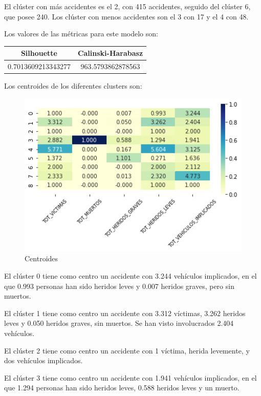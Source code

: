 \documentclass[a4]{article}
\begin{document}
El clúster con más accidentes es el 2, con 415 accidentes, seguido del clúster 6, que posee 240. Los clúster con menos accidentes son el 3 con 17 y el 4 con 48.

Los valores de las métricas para este modelo son:

\begin{center}
\begin{tabular}{|c|c|}
\hline
\multicolumn{1}{|c|}{\textbf{Silhouette}} & \textbf{Calinski-Harabasz}\\ \hline
  0.7013609213343277 & 963.5793862878563 \\ \hline
\end{tabular}
\end{center}

Los centroides de los diferentes clusters son:

\begin{figure}[H]
  \centering
  \caption{Centroides}
  \includegraphics[width=130mm]{imagenes/c2_kmeans_centroides}
\end{figure}

El clúster 0 tiene como centro un accidente con 3.244 vehículos implicados, en el que 0.993 personas han sido heridos leves y 0.007 heridos graves, pero sin muertos.

El clúster 1 tiene como centro un accidente con 3.312 víctimas, 3.262 heridos leves y 0.050 heridos graves, sin muertos. Se han visto involucrados 2.404 vehículos.

El clúster 2 tiene como centro un accidente con 1 víctima, herida levemente, y dos vehículos implicados.

El clúster 3 tiene como centro un accidente con 1.941 vehículos implicados, en el que 1.294 personas han sido heridos leves, 0.588 heridos leves y un muerto.
\end{document}
